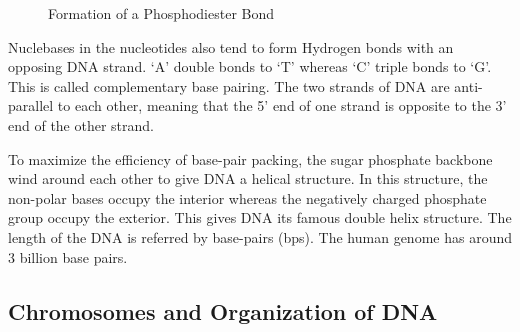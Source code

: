 \documentclass[letterpaper,12pt]{article}
\begin{document}
\begin{figure}[!h]
	\centering
	\caption{Formation of a Phosphodiester Bond}
\end{figure}

Nuclebases in the nucleotides also tend to form Hydrogen bonds with an opposing DNA strand. `A' double bonds to `T' whereas `C' triple bonds to `G'. This is called complementary base pairing. The two strands of DNA are anti-parallel to each other, meaning that the 5' end of one strand is opposite to the 3' end of the other strand.

To maximize the efficiency of base-pair packing, the sugar phosphate backbone wind around each other to give DNA a helical structure. In this structure, the non-polar bases occupy the interior whereas the negatively charged phosphate group occupy the exterior. This gives DNA its famous double helix structure. The length of the DNA is referred by base-pairs (bps). The human genome has around 3 billion base pairs.

\subsection{Chromosomes and Organization of DNA}
\end{document}
